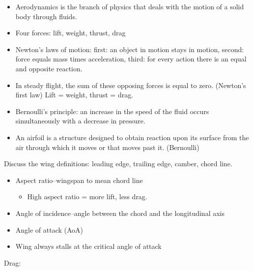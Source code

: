 \begin{itemize}
  \item Aerodynamics is the branch of physics that deals with the motion of a
    solid body through fluids.

  \item Four forces: lift, weight, thrust, drag

  \item Newton's laws of motion: first: an object in motion stays in motion,
    second: force equals mass times acceleration, third: for every action there
    is an equal and opposite reaction.

  \item In steady flight, the sum of these opposing forces is equal to zero.
    (Newton's first law) Lift = weight, thrust = drag.

  \item Bernoulli's principle: an increase in the speed of the fluid occurs
    simultaneously with a decrease in pressure.

  \item An airfoil is a structure designed to obtain reaction upon its surface
    from the air through which it moves or that moves past it. (Bernoulli)
\end{itemize}

Discuss the wing definitions: leading edge, trailing edge, camber, chord line.

\begin{itemize}
  \item Aspect ratio--wingspan to mean chord line
    \begin{itemize}
      \item High aspect ratio = more lift, less drag.
    \end{itemize}

  \item Angle of incidence--angle between the chord and the longitudinal axis

  \item Angle of attack (AoA)

  \item Wing always stalls at the critical angle of attack
\end{itemize}

Drag:

